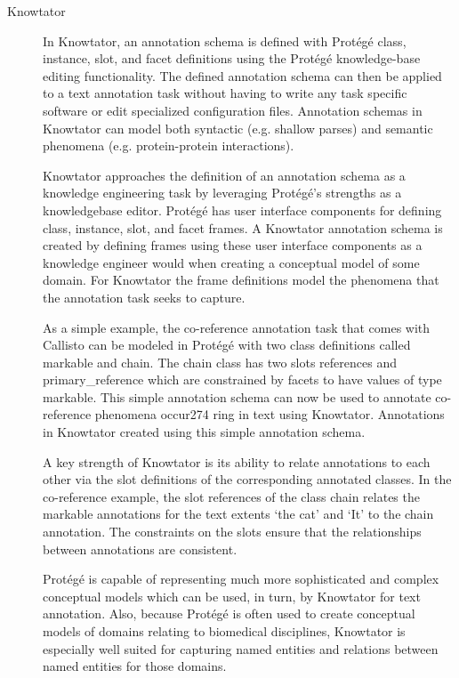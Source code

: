 \begin{description}
    \item[Knowtator]
    In Knowtator, an annotation
    schema is defined with Protégé class, instance,
    slot, and facet definitions using the Protégé knowledge-base editing functionality. The defined annotation schema can then be applied to a text
    annotation task without having to write any task
    specific software or edit specialized configuration
    files. Annotation schemas in Knowtator can model
    both syntactic (e.g. shallow parses) and semantic
    phenomena (e.g. protein-protein interactions). 

    Knowtator approaches the definition of an annotation schema as a knowledge engineering task by
    leveraging Protégé’s strengths as a knowledgebase editor. Protégé has user interface components
    for defining class, instance, slot, and facet frames.
    A Knowtator annotation schema is created by defining frames using these user interface components as a knowledge engineer would when
    creating a conceptual model of some domain. For
    Knowtator the frame definitions model the phenomena that the annotation task seeks to capture.

    As a simple example, the co-reference annotation task that comes with Callisto can be modeled
    in Protégé with two class definitions called markable and chain. The chain class has two slots references and primary_reference which are
    constrained by facets to have values of type markable. This simple annotation schema can now be
    used to annotate co-reference phenomena occur274
    ring in text using Knowtator. Annotations in
    Knowtator created using this simple annotation
    schema.
    
    A key strength of Knowtator is its ability to relate annotations to each other via the slot definitions of the corresponding annotated classes. In
    the co-reference example, the slot references of the
    class chain relates the markable annotations for the
    text extents ‘the cat’ and ‘It’ to the chain annotation. The constraints on the slots ensure that the
    relationships between annotations are consistent.

    Protégé is capable of representing much more
    sophisticated and complex conceptual models
    which can be used, in turn, by Knowtator for text
    annotation. Also, because Protégé is often used to
    create conceptual models of domains relating to
    biomedical disciplines, Knowtator is especially
    well suited for capturing named entities and relations between named entities for those domains. 
    

\end{description}
